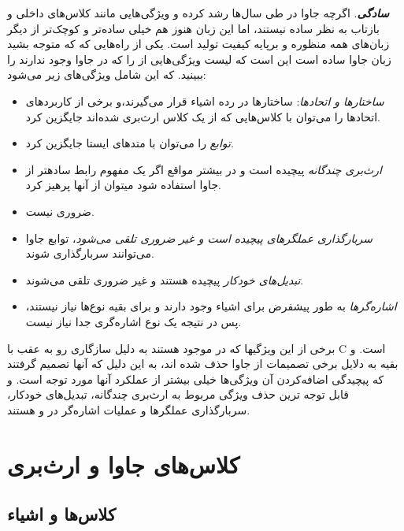 \documentclass[a4paper,12pt]{report}
\begin{document}
	 \textbf{\textit{
	 سادگی}}. اگرچه جاوا در طی سال‌ها رشد کرده و ویژگی‌هایی مانند کلاس‌های داخلی و بازتاب به نظر ساده نیستند، اما این زبان هنوز هم خیلی ساده‌تر و کوچک‌تر از دیگر زبان‌های همه منظوره و برپایه کیفیت تولید است. یکی از راه‌هایی که که متوجه بشید زبان جاوا ساده است این است که لیست ویژگی‌هایی از 
 	را که در جاوا وجود ندارند را ببینید. که این شامل ویژگی‌های زیر می‌شود:
 	
	\begin{itemize}[nosep]
 		\renewcommand{\labelitemi}{\color{gray}\scriptsize$\blacksquare$}
 		\item 
 		\textit{
 		ساختار‌ها و اتحادها}: ساختارها در رده اشیاء قرار می‌گیرند،‌و برخی از کاربرد‌های اتحادها را می‌توان
 	 با کلاس‌هایی که از یک کلاس ارث‌بری شده‌اند جایگزین کرد.
 	
	 	\item 
	 	\textit{
	 	توابع} را می‌توان با متد‌های ایستا جایگزین کرد.
	 	\item 
	 	\textit{
	 	ارث‌بری چندگانه} پیچیده است و در بیشتر مواقع اگر یک مفهوم رابط سادهتر از جاوا استفاده شود میتوان از آنها پرهیز کرد.
	 	\item 
	 	\textit{
	 	}
 		ضروری نیست.
	 	\item 
	 	\textit{
	 	سربارگذاری عملگر‌های پیچیده است و غیر ضروری تلقی می‌شود}، توابع جاوا می‌توانند سربارگذاری شوند.
	 	\item 
	 	\textit{
	 	تبدیل‌های خودکار} پیچیده هستند و غیر ضروری تلقی می‌شوند.
	 	\item 
	 	\textit{
	 	اشاره‌گرها} به طور پیشفرض برای اشیاء وجود دارند و برای بقیه نوع‌ها نیاز نیستند، پس در نتیجه یک نوع اشاره‌گری جدا نیاز نیست.
 	\end{itemize}
 	
 	برخی از این ویژگیها که در 
 	موجود هستند به دلیل سازگاری رو به عقب با C  است. و بقیه به دلایل برخی تصمیمات از جاوا حذف شده اند، به این دلیل که آنها تصمیم گرفتند که پیچیدگی اضافه‌کردن آن ویژگی‌ها خیلی بیشتر از عملکرد آنها مورد توجه است. و قابل توجه ترین حذف ویژگی مربوط به ارث‌‌بری چندگانه،  تبدیل‌های خودکار، سربارگذاری عملگر‌ها و عملیات اشاره‌گر در 
 	 و 
 	هستند.
 	
 	\section{
 	کلاس‌های جاوا و ارث‌بری}
 	\label{sec2:chap13}
 	\subsection{
 	کلاس‌ها و اشیاء
 	}\label{subsec1:sec2:chap13}
 			
\end{document}
